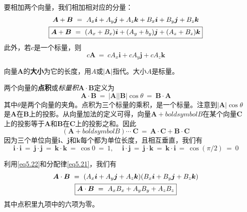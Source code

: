 \documentclass[12pt,a4paper,openany]{ctexbook}
\newcommand{\abs}[1]{\left| #1 \right|}
\begin{document}
\begin{flushleft}
要相加两个向量，我们相加相对应的分量：
\begin{gather}
    \boldsymbol{A}+\boldsymbol{B}\ =\ A_x\boldsymbol{i}+A_y\boldsymbol{j}+A_z\boldsymbol{k}+B_x\boldsymbol{i}+B_y\boldsymbol{j}+B_z\boldsymbol{k} \notag \\
    \boxed{\boldsymbol{A}+\boldsymbol{B}\ =\ (A_x+B_x)\boldsymbol{i}+(A_y+b_y)\boldsymbol{j}+(A_z+B_z)\boldsymbol{k}} \label{eq5.18}
\end{gather}
此外，若$c$是一个标量，则
\begin{equation}
    \boxed{c\boldsymbol{A}\ =\ cA_x\boldsymbol{i}+cA_y\boldsymbol{j}+cA_z\boldsymbol{k}} \label{eq5.19}
\end{equation}

向量$\boldsymbol{A}$的\textbf{大小}为它的长度，用$A$或$\abs{\boldsymbol{A}}$指代。大小$A$是标量。

两个向量的\textbf{点积}或\textit{标量积}$\boldsymbol{A}\cdot\boldsymbol{B}$定义为
\begin{equation}
    \boxed{\boldsymbol{A}\cdot\boldsymbol{B}\ =\ \abs{\boldsymbol{A}}\abs{\boldsymbol{B}}\cos\theta\ =\ \boldsymbol{B}\cdot\boldsymbol{A}} \label{eq5.20}
\end{equation}
其中$\theta$是两个向量的夹角。点积为三个标量的乘积，是一个标量。注意到$\abs{\boldsymbol{A}}\cos\theta$是$\boldsymbol{A}$在$\boldsymbol{B}$上的投影。从向量加法的定义可得，向量$\boldsymbol{A}+boldsymbol{B}$在某个向量$\boldsymbol{C}$上的投影等于$\boldsymbol{A}$和$\boldsymbol{B}$在$\boldsymbol{C}$上的投影之和。因此
\begin{equation}
    (\boldsymbol{A}+boldsymbol{B})\cdots\ \boldsymbol{C}\ =\ \boldsymbol{A}\cdot\boldsymbol{C}+\boldsymbol{B}\cdot\boldsymbol{C} \label{eq5.21}
\end{equation}
因为三个单位向量$\boldsymbol{i}$、$\boldsymbol{j}$和$\boldsymbol{k}$每个都为单位长度，且相互垂直，我们有
\begin{equation}
    \boldsymbol{i}\cdot\boldsymbol{i}\ =\ \boldsymbol{j}\cdot\boldsymbol{j}\ =\ \boldsymbol{k}\cdot\boldsymbol{k}\ =\ \cos 0\ =\ 1,\quad\ \boldsymbol{i}\cdot\boldsymbol{j}\ =\ \boldsymbol{j}\cdot\boldsymbol{k}\ =\ \boldsymbol{k}\cdot\boldsymbol{i}\ =\ \cos(\pi/2)\ =\ 0 \label{eq5.22}
\end{equation}

利用\eqref{eq5.22}和分配律\eqref{eq5.21}，我们有
\begin{gather}
    \boldsymbol{A}\cdot\boldsymbol{B}\ =\ (A_x\boldsymbol{i}+A_y\boldsymbol{j}+A_z\boldsymbol{k})(B_x\boldsymbol{i}+B_y\boldsymbol{j}+B_z\boldsymbol{k}) \notag \\
    \boxed{\boldsymbol{A}\cdot\boldsymbol{B}\ =\ A_xB_x+A_yB_y+A_zB_z} \label{eq5.23}
\end{gather}
其中点积里九项中的六项为零。


\end{flushleft}
\end{document}
